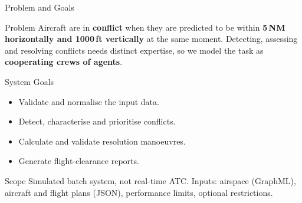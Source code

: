 

\begin{frame}{Problem and Goals}

\begin{block}{Problem}
\small
Aircraft are in \textbf{conflict} when they are predicted to be within
\textbf{5\,NM horizontally and 1000\,ft vertically} at the same moment.
Detecting, assessing and resolving conflicts needs distinct expertise,
so we model the task as \textbf{cooperating crews of agents}.
\end{block}

\begin{block}{System Goals}
\small
    \begin{itemize}
        \setlength{\itemsep}{1pt}
        \item Validate and normalise the input data.
        \item Detect, characterise and prioritise conflicts.
        \item Calculate and validate resolution manoeuvres.
        \item Generate flight-clearance reports.
    \end{itemize}
\end{block}

\begin{alertblock}{Scope}
\small
    Simulated batch system, not real-time ATC. Inputs: airspace (GraphML),
    aircraft and flight plans (JSON), performance limits, optional restrictions.
\end{alertblock}

\end{frame}
